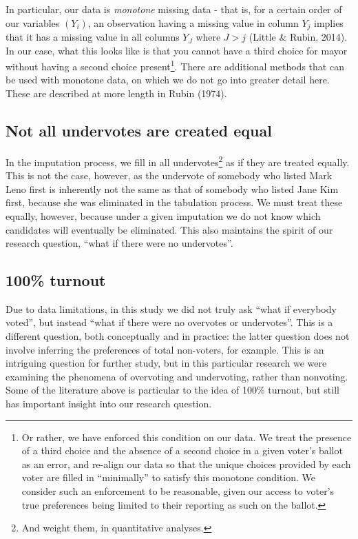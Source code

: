 \documentclass[12pt,twoside]{reedthesis}
\begin{document}
In particular, our data is \emph{monotone} missing data - that is, for a certain order of our variables \((Y_i)\), an observation having a missing value in column \(Y_j\) implies that it has a missing value in all columns \(Y_J\) where \(J > j\) (Little \& Rubin, 2014). In our case, what this looks like is that you cannot have a third choice for mayor without having a second choice present\footnote{Or rather, we have enforced this condition on our data. We treat the presence of a third choice and the absence of a second choice in a given voter's ballot as an error, and re-align our data so that the unique choices provided by each voter are filled in ``minimally'' to satisfy this monotone condition. We consider such an enforcement to be reasonable, given our access to voter's true preferences being limited to their reporting as such on the ballot.}. There are additional methods that can be used with monotone data, on which we do not go into greater detail here. These are described at more length in Rubin (1974).

\hypertarget{not-all-undervotes-are-created-equal}{%
\subsection{Not all undervotes are created equal}\label{not-all-undervotes-are-created-equal}}

In the imputation process, we fill in all undervotes\footnote{And weight them, in quantitative analyses.} as if they are treated equally. This is not the case, however, as the undervote of somebody who listed Mark Leno first is inherently not the same as that of somebody who listed Jane Kim first, because she was eliminated in the tabulation process. We must treat these equally, however, because under a given imputation we do not know which candidates will eventually be eliminated. This also maintains the spirit of our research question, ``what if there were no undervotes''.

\hypertarget{turnout}{%
\subsection{100\% turnout}\label{turnout}}

Due to data limitations, in this study we did not truly ask ``what if everybody voted'', but instead ``what if there were no overvotes or undervotes''. This is a different question, both conceptually and in practice: the latter question does not involve inferring the preferences of total non-voters, for example. This is an intriguing question for further study, but in this particular research we were examining the phenomena of overvoting and undervoting, rather than nonvoting. Some of the literature above is particular to the idea of 100\% turnout, but still has important insight into our research question.
\end{document}
